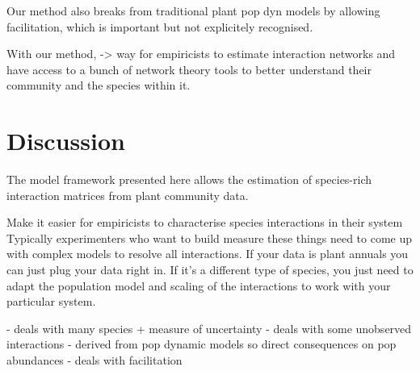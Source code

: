 \documentclass[a4,12pt]{article}
\begin{document}
    Our method also breaks from traditional plant pop dyn models by allowing facilitation, which is important but not explicitely recognised.

    With our method, -> way for empiricists to estimate interaction networks and have access to a bunch of network theory tools to better understand their community and the species within it. 









    \section{Discussion}

    
    The model framework presented here allows the estimation of species-rich interaction matrices from plant community data. 

    Make it easier for empiricists to characterise species interactions in their system
    Typically experimenters who want to build measure these things need to come up with complex models to resolve all interactions. If your data is plant annuals you can just plug your data right in. If it's a different type of species, you just need to adapt the population model and scaling of the interactions to work with your particular system. 

    - deals with many species + measure of uncertainty
    - deals with some unobserved interactions
    - derived from pop dynamic models so direct consequences on pop abundances
    - deals with facilitation 
\end{document}
